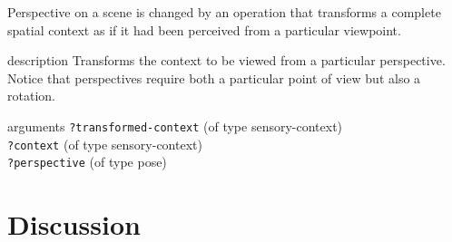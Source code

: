 Perspective on a scene is changed by an operation that transforms
a complete spatial context as if it had been perceived from a 
particular viewpoint.

\begin{explanation}{description}
Transforms the context to be viewed from a particular perspective.
Notice that perspectives require both a particular point of view
but also a rotation.
\end{explanation}
\begin{explanation}{arguments}
{\footnotesize\verb+?transformed-context+} (of type sensory-context) \\
{\footnotesize\verb+?context+} (of type sensory-context) \\
{\footnotesize\verb+?perspective+} (of type pose)
\vspace{0.3cm}
\end{explanation}

\section{Discussion}

